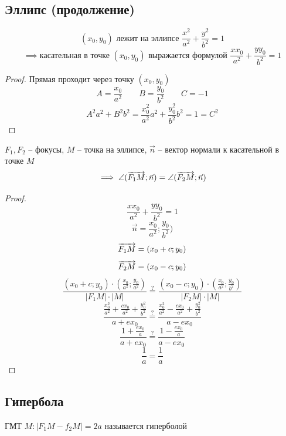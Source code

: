 \chapter{}

\section{Эллипс (продолжение)}

\begin{theorem}
    $$ (x_0, y_0) \text{ лежит на эллипсе } \frac{x^2}{a^2} + \frac{y^2}{b^2} = 1 $$
    $$ \implies \text{касательная в точке } (x_0, y_0) \text{ выражается формулой } \frac{xx_0}{a^2} + \frac{yy_0}{b^2} = 1 $$
\end{theorem}

\begin{proof}
	Прямая проходит через точку $(x_0, y_0) $
    $$ A = \frac{x_0}{a^2} \qquad B = \frac{y_0}{b^2} \qquad C = -1 $$
    $$ A^2 a^2 + B^2 b^2 = \frac{x_0^2}{a^2} a^2 + \frac{y_0^2}{b^2} b^2 = 1 = C ^2 $$
\end{proof}

\begin{theorem}
    $ F_1, F_2 $ -- фокусы, $ M $ -- точка на эллипсе, $ \vec{n} $ -- вектор нормали к касательной в точке $M$
    $$ \implies \angle (\overrightarrow{F_1M}; \vec{n}) = \angle (\overrightarrow{F_2M}; \vec{n}) $$
\end{theorem}

\begin{proof}
    $$ \frac{xx_0}{a^2} + \frac{yy_0}{b^2} = 1 $$
    $$ \vec{n} = \frac{x_0}{a^2}; \frac{y_0}{b^2}) $$
    $$ \overrightarrow{F_1M} = (x_0 + c; y_0) $$
    $$ \overrightarrow{F_2M} = (x_0 - c; y_0) $$
    $$ \frac{(x_0 + c; y_0) \cdot (\frac{x_0}{a^2}; \frac{y_0}{a^2})}{|F_1M| \cdot |M|} \stackrel?= \frac{(x_0 - c; y_0) \cdot (\frac{x_0}{a^2}; \frac{y_0}{b^2})}{|F_2M| \cdot |M|} $$
    $$ \frac{\frac{x_0^2}{a^2} + \frac{cx_0}{a^2} + \frac{y_0^2}{b^2}}{a + ex_0} \stackrel?= \frac{\frac{x_0^2}{a^2} - \frac{cx_0}{a^2} + \frac{y_0^2}{b^2}}{a - ex_0} $$
    $$ \frac{1 + \frac{ex_0}a}{a + ex_0} \stackrel?= \frac{1 - \frac{ex_0}a}{a - ex_0} $$
    $$ \frac1a = \frac 1a $$
\end{proof}

\section{Гипербола}

\begin{definition}
	ГМТ $ M : |F_1M - f_2M| = 2a $ называется гиперболой
\end{definition}

